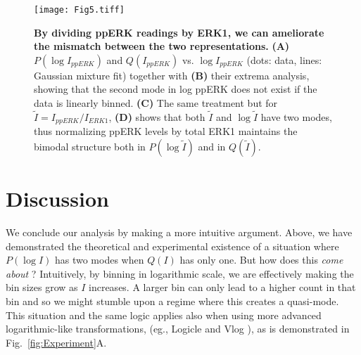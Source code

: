 \documentclass[11pt,a4paper,draft]{article}
\begin{document}
\smallskip
\begin{figure}
 \centering
   \texttt{[image: Fig5.tiff]}  
  \caption{\textbf{By dividing ppERK readings by ERK1, we can ameliorate the mismatch between the two representations.} \textbf{(A)} $P(\log I_{ppERK})$ and $Q(I_{ppERK})$ vs. $\log I_{ppERK}$ (dots: data, lines: Gaussian mixture fit) together with \textbf{(B)} their extrema analysis, showing that the second mode in log ppERK does not exist if the data is linearly binned. \textbf{(C)} The same treatment but for $\tilde{I} = I_{ppERK}/I_{ERK1}$, \textbf{(D)} shows that both $\tilde{I}$ and $\log \tilde{I}$ have two modes, thus normalizing ppERK levels by total ERK1 maintains the bimodal structure both in $P(\log \tilde{I})$ and in $Q(\tilde{I})$. }
  \label{fig:NormppERKbyERK}
\end{figure}

\smallskip

\newpage
\section*{Discussion}
We conclude our analysis by making a more intuitive argument. Above, we have demonstrated the theoretical and experimental existence of a situation where $P(\log I)$ has two modes when $Q(I)$ has only one. But how does this \emph{come about} ? Intuitively, by binning in logarithmic scale, we are effectively making the bin sizes grow as $I$ increases. A larger bin can only lead to a higher count in that bin and so we might stumble upon a regime where this creates a quasi-mode. This situation and the same logic applies also when using more advanced logarithmic-like transformations, (eg., Logicle \cite{Parks2006} and Vlog \cite{Bagwell2016} ), as is demonstrated in Fig.~\ref{fig:Experiment}A. 
 
\end{document}

